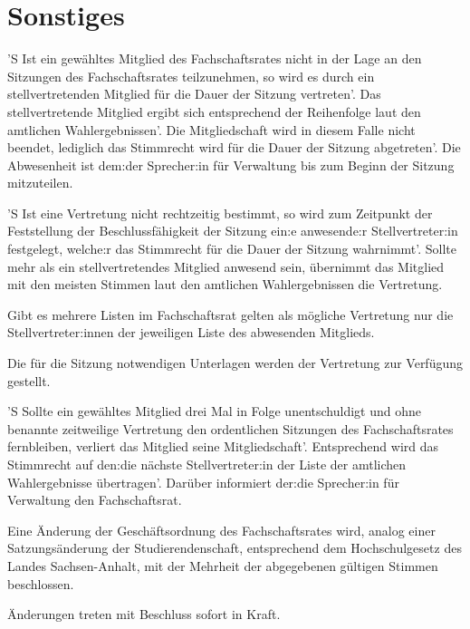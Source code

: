 \documentclass[%
    parskip=half,
]{scrartcl}
\begin{document}
\section{Sonstiges}

\begin{contract}


'S Ist ein gewähltes Mitglied des Fachschaftsrates nicht in der Lage an den Sitzungen des Fachschaftsrates teilzunehmen, so wird es durch ein stellvertretenden Mitglied für die Dauer der Sitzung vertreten'.
Das stellvertretende Mitglied ergibt sich entsprechend der Reihenfolge laut den amtlichen Wahlergebnissen'.
Die Mitgliedschaft wird in diesem Falle nicht beendet, lediglich das Stimmrecht wird für die Dauer der Sitzung abgetreten'.
Die Abwesenheit ist dem:der Sprecher:in für Verwaltung bis zum Beginn der Sitzung mitzuteilen.

'S Ist eine Vertretung nicht rechtzeitig bestimmt, so wird zum Zeitpunkt der Feststellung der Beschlussfähigkeit der Sitzung ein:e anwesende:r Stellvertreter:in festgelegt, welche:r das Stimmrecht für die Dauer der Sitzung wahrnimmt'.
Sollte mehr als ein stellvertretendes Mitglied anwesend sein, übernimmt das Mitglied mit den meisten Stimmen laut den amtlichen Wahlergebnissen die Vertretung.

Gibt es mehrere Listen im Fachschaftsrat gelten als mögliche Vertretung nur die Stellvertreter:innen der jeweiligen Liste des abwesenden Mitglieds.

Die für die Sitzung notwendigen Unterlagen werden der Vertretung zur Verfügung gestellt.

'S Sollte ein gewähltes Mitglied drei Mal in Folge unentschuldigt und ohne benannte zeitweilige Vertretung den ordentlichen Sitzungen des Fachschaftsrates fernbleiben, verliert das Mitglied seine Mitgliedschaft'.
Entsprechend wird das Stimmrecht auf den:die nächste Stellvertreter:in der Liste der amtlichen Wahlergebnisse übertragen'.
Darüber informiert der:die Sprecher:in für Verwaltung den Fachschaftsrat.


Eine Änderung der Geschäftsordnung des Fachschaftsrates wird, analog einer Satzungsänderung der Studierendenschaft, entsprechend dem Hochschulgesetz des Landes Sachsen-Anhalt, mit der Mehrheit der abgegebenen gültigen Stimmen beschlossen.

Änderungen treten mit Beschluss sofort in Kraft.


\end{contract}
\end{document}
